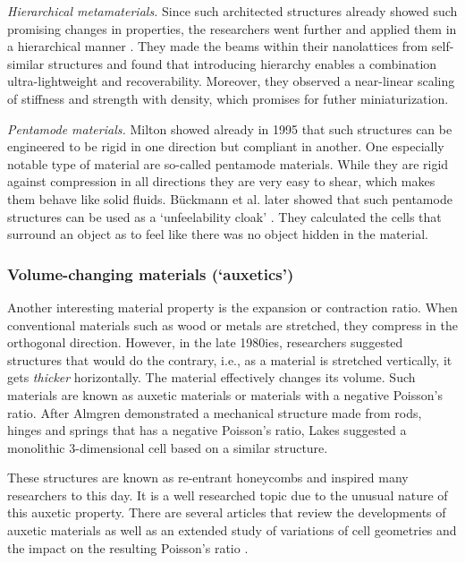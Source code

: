 {\textit{Hierarchical metamaterials. } Since such architected structures already showed such promising changes in properties, the researchers went further and applied them in a hierarchical manner \cite{Meza2015}. They made the beams within their nanolattices from self-similar structures and found that introducing hierarchy enables a combination ultra-lightweight and recoverability. Moreover, they observed a near-linear scaling of stiffness and strength with density, which promises for futher miniaturization.

\textit{Pentamode materials. } Milton \cite{Milton1995b} showed already in 1995 that such structures can be engineered to be rigid in one direction but compliant in another. One especially notable type of material are so-called pentamode materials. While they are rigid against compression in all directions they are very easy to shear, which makes them behave like solid fluids. Bückmann et al. later showed that such pentamode structures can be used as a `unfeelability cloak' \cite{Buckmann2014, Buckmann2015a}. They calculated the cells that surround an object as to feel like there was no object hidden in the material.



\subsubsection{Volume-changing materials (`auxetics')}

Another interesting material property is the expansion or contraction ratio. When conventional materials such as wood or metals are stretched, they compress in the orthogonal direction. However, in the late 1980ies, researchers suggested structures that would do the contrary, i.e., as a material is stretched vertically, it gets \textit{thicker} horizontally. The material effectively changes its volume. Such materials are known as auxetic materials or materials with a negative Poisson's ratio. After Almgren \cite{Almgren1985} demonstrated a mechanical structure made from rods, hinges and springs that has a negative Poisson's ratio, Lakes \cite{Lakes1987} suggested a monolithic 3-dimensional cell based on a similar structure.  


These structures are known as re-entrant honeycombs and inspired many researchers to this day. It is a well researched topic due to the unusual nature of this auxetic property. There are several articles that review the developments of auxetic materials \cite{Ren2018, Kolken2017, Saxena2016, Christensen2015, Mir2014a} as well as an extended study of variations of cell geometries and the impact on the resulting Poisson's ratio \cite{AlvarezElipe2012}.

}
